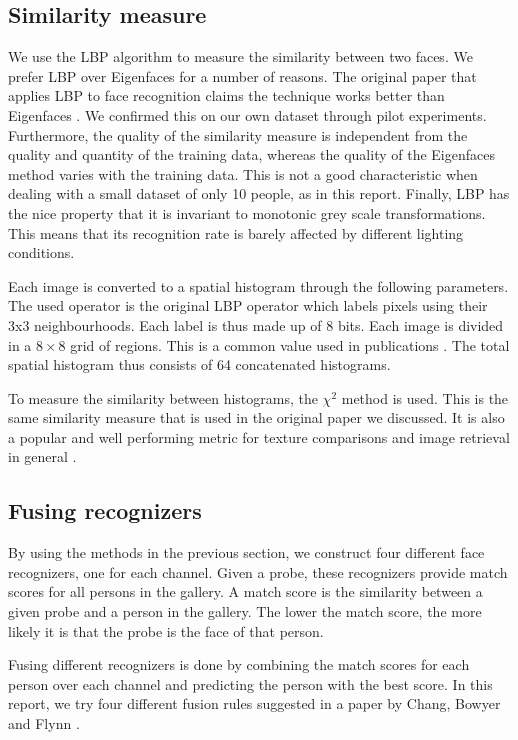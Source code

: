 \documentclass[]{article}
\begin{document}
\subsection{Similarity measure}
We use the LBP algorithm to measure the similarity between two faces. We prefer LBP over Eigenfaces for a number of reasons. The original paper that applies LBP to face recognition claims the technique works better than Eigenfaces \cite{ahonen2004face}. We confirmed this on our own dataset through pilot experiments. Furthermore, the quality of the similarity measure is independent from the quality and quantity of the training data, whereas the quality of the Eigenfaces method varies with the training data. This is not a good characteristic when dealing with a small dataset of only 10 people, as in this report. Finally, LBP has the nice property that it is invariant to monotonic grey scale transformations. This means that its recognition rate is barely affected by different lighting conditions.

Each image is converted to a spatial histogram through the following parameters. The used operator is the original LBP operator which labels pixels using their 3x3 neighbourhoods. Each label is thus made up of 8 bits. Each image is divided in a $8 \times 8$ grid of regions. This is a common value used in publications \cite{facerecognizer2016}. The total spatial histogram thus consists of 64 concatenated histograms.

To measure the similarity between histograms, the $\chi^2$ method is used. This is the same similarity measure that is used in the original paper we discussed. It is also a popular and well performing metric for texture comparisons and image retrieval in general \cite{puzicha1997non}.

\subsection{Fusing recognizers}
By using the methods in the previous section, we construct four different face recognizers, one for each channel. Given a probe, these recognizers provide match scores for all persons in the gallery. A match score is the similarity between a given probe and a person in the gallery. The lower the match score, the more likely it is that the probe is the face of that person.

Fusing different recognizers is done by combining the match scores for each person over each channel and predicting the person with the best score. In this report, we try four different fusion rules suggested in a paper by Chang, Bowyer and Flynn \cite{chang2005evaluation}.
\end{document}

